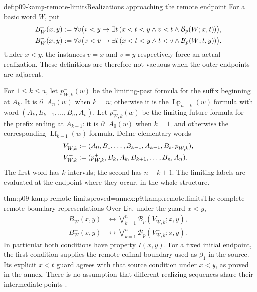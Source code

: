 \begin{hbdefinition}{def:p09-kamp-remote-limits}{Realizations approaching the remote endpoint}
For a basic word \(W\), put
\[
\begin{aligned}
 B_W^+(x,y)&\mathrel{:=}\forall v\bigl(v<y\to
  \exists t\,(x<t<y\land v<t\land\mathcal B_p(W;x,t))\bigr),\\
 B_W^-(x,y)&\mathrel{:=}\forall v\bigl(x<v\to
  \exists t\,(x<t<y\land t<v\land\mathcal B_p(W;t,y))\bigr).
\end{aligned}
\]
Under \(x<y\), the instances \(v=x\) and \(v=y\)
respectively force an actual realization. These definitions are therefore
not vacuous when the outer endpoints are adjacent.

For \(1\leq k\leq n\), let \(p_{W,k}^-(w)\) be the
limiting-past formula for the suffix beginning at \(A_k\).
It is \(\partial^-A_n(w)\) when \(k=n\); otherwise it is
the \(\operatorname{Lp}_{n-k}(w)\) formula with word
\((A_k,B_{k+1},\ldots,B_n,A_n)\).
Let \(p_{W,k}^+(w)\) be the limiting-future formula for the
prefix ending at \(A_{k-1}\): it is \(\partial^+A_0(w)\)
when \(k=1\), and otherwise the corresponding
\(\operatorname{Lf}_{k-1}(w)\) formula. Define elementary words
\[
\begin{aligned}
 V_{W,k}^+&\mathrel{:=}(A_0,B_1,\ldots,B_{k-1},A_{k-1},B_k,p_{W,k}^-),\\
 V_{W,k}^-&\mathrel{:=}(p_{W,k}^+,B_k,A_k,B_{k+1},\ldots,B_n,A_n).
\end{aligned}
\]
The first word has \(k\) intervals; the second has \(n-k+1\).
The limiting labels are evaluated at the endpoint where they occur,
in the whole structure.
\end{hbdefinition}

\begin{hblemma}{thm:p09-kamp-remote-limits}{proved=annex:p9.kamp.remote.limits}{The complete remote-boundary representations}
Over \(\mathsf{Lin}\), under the guard \(x<y\),
\[
\begin{aligned}
 B_W^+(x,y)&\longleftrightarrow
             \bigvee_{k=1}^n\mathcal B_p(V_{W,k}^+;x,y),\\
 B_W^-(x,y)&\longleftrightarrow
             \bigvee_{k=1}^n\mathcal B_p(V_{W,k}^-;x,y).
\end{aligned}
\]
In particular both conditions have property \(I(x,y)\).
For a fixed initial endpoint, the first condition supplies the
remote cofinal boundary used as \(\beta_1\) in the source.
Its explicit \(x<t\) guard agrees with that source condition
under \(x<y\), as proved in the annex. There is no assumption
that different realizing sequences share their intermediate points
\cite[ch.~III, pp.~85, 89--90]{Kamp1968}.
\end{hblemma}

